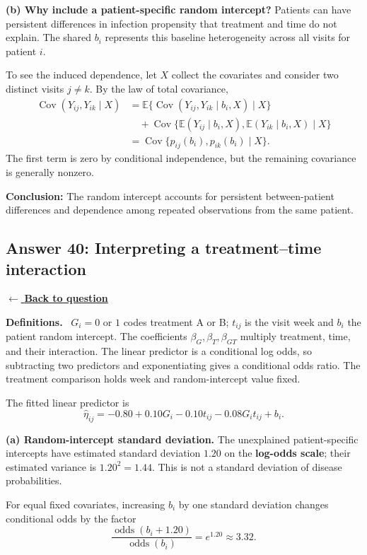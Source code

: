 \documentclass[11pt,a4paper]{article}
\newcommand{\given}{\mathrel{|}}
\newcommand{\E}{\mathbb{E}}
\newcommand{\answernav}[1]{%
  \label{answer:#1}%
  \noindent\hyperref[question:#1]{$\leftarrow$ \textbf{Back to question}}%
  \par\smallskip}
\newcommand{\studyheading}[1]{%
  \par\medskip\noindent\textcolor{statblue}{\textbf{#1.}}\ }
\begin{document}
\textbf{(b) Why include a patient-specific random intercept?}
Patients can have persistent differences in infection propensity that
treatment and time do not explain. The shared $b_i$ represents this
baseline heterogeneity across all visits for patient $i$.

To see the induced dependence, let $X$ collect the covariates and consider
two distinct visits $j\ne k$. By the law of total covariance,
\begin{align*}
\operatorname{Cov}(Y_{ij},Y_{ik}\given X)
&=\E\{\operatorname{Cov}(Y_{ij},Y_{ik}\given b_i,X)\given X\}\\
&\quad+\operatorname{Cov}\{
\E(Y_{ij}\given b_i,X),\E(Y_{ik}\given b_i,X)\given X\}\\
&=\operatorname{Cov}\{p_{ij}(b_i),p_{ik}(b_i)\given X\}.
\end{align*}
The first term is zero by conditional independence, but the remaining
covariance is generally nonzero.

\textbf{Conclusion:} The random intercept accounts for persistent
between-patient differences and dependence among repeated observations
from the same patient.

\clearpage

\subsection{Answer 40: Interpreting a treatment--time interaction}
\answernav{40}

\studyheading{Definitions}
$G_i=0$ or $1$ codes treatment A or B; $t_{ij}$ is the visit week and $b_i$ the patient random intercept.
The coefficients $\beta_G,\beta_T,\beta_{GT}$ multiply treatment, time, and their interaction.
The linear predictor is a conditional log odds, so subtracting two predictors and exponentiating gives a conditional odds ratio.
The treatment comparison holds week and random-intercept value fixed.

The fitted linear predictor is
\[
\widehat\eta_{ij}
=-0.80+0.10G_i-0.10t_{ij}-0.08G_it_{ij}+b_i.
\]

\textbf{(a) Random-intercept standard deviation.}
The unexplained patient-specific intercepts have estimated standard
deviation $1.20$ on the \textbf{log-odds scale}; their estimated variance
is $1.20^2=1.44$. This is not a standard deviation of disease probabilities.

For equal fixed covariates, increasing $b_i$ by one standard deviation
changes conditional odds by the factor
\[
\frac{\operatorname{odds}(b_i+1.20)}{\operatorname{odds}(b_i)}
=e^{1.20}\approx3.32.
\]
\end{document}
